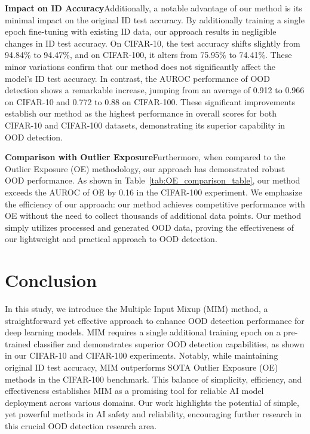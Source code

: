 \documentclass[letterpaper]{article} %
\begin{document}
\smallskip
\noindent\textbf{Impact on ID Accuracy}\indent Additionally, a notable advantage of our method is its minimal impact on the original ID test accuracy. By additionally training a single epoch fine-tuning with existing ID data, our approach results in negligible changes in ID test accuracy. On CIFAR-10, the test accuracy shifts slightly from 94.84\% to 94.47\%, and on CIFAR-100, it alters from 75.95\% to 74.41\%. These minor variations confirm that our method does not significantly affect the model's ID test accuracy. In contrast, the AUROC performance of OOD detection shows a remarkable increase, jumping from an average of 0.912 to 0.966 on CIFAR-10 and 0.772 to 0.88 on CIFAR-100. These significant improvements establish our method as the highest performance in overall scores for both CIFAR-10 and CIFAR-100 datasets, demonstrating its superior capability in OOD detection.

\smallskip
\noindent\textbf{Comparison with Outlier Exposure}\indent Furthermore, when compared to the Outlier Exposure (OE) methodology, our approach has demonstrated robust OOD performance. As shown in Table~\ref{tab:OE_comparison_table}, our method exceeds the AUROC of OE by 0.16 in the CIFAR-100 experiment. We emphasize the efficiency of our approach: our method achieves competitive performance with OE without the need to collect thousands of additional data points. Our method simply utilizes processed and generated OOD data, proving the effectiveness of our lightweight and practical approach to OOD detection.

\section{Conclusion}
In this study, we introduce the Multiple Input Mixup (MIM) method, a straightforward yet effective approach to enhance OOD detection performance for deep learning models. MIM requires a single additional training epoch on a pre-trained classifier and demonstrates superior OOD detection capabilities, as shown in our CIFAR-10 and CIFAR-100 experiments. Notably, while maintaining original ID test accuracy, MIM outperforms SOTA Outlier Exposure (OE) methods in the CIFAR-100 benchmark. This balance of simplicity, efficiency, and effectiveness establishes MIM as a promising tool for reliable AI model deployment across various domains. Our work highlights the potential of simple, yet powerful methods in AI safety and reliability, encouraging further research in this crucial OOD detection research area.
\end{document}
